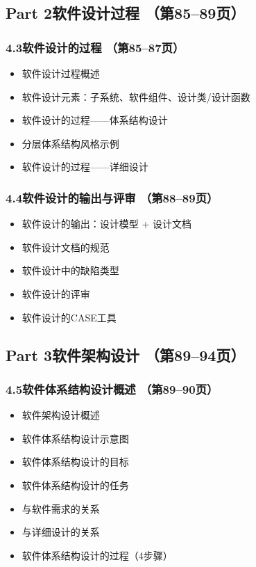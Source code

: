 \documentclass[12pt,a4paper]{ctexart}
\begin{document}
\subsection{Part 2\quad 软件设计过程 \hfill（第85--89页）}

\subsubsection{4.3\quad 软件设计的过程 \hfill（第85--87页）}
\begin{itemize}
    \item 软件设计过程概述
    \item 软件设计元素：子系统、软件组件、设计类/设计函数
    \item 软件设计的过程——体系结构设计
    \item 分层体系结构风格示例
    \item 软件设计的过程——详细设计
\end{itemize}

\subsubsection{4.4\quad 软件设计的输出与评审 \hfill（第88--89页）}
\begin{itemize}
    \item 软件设计的输出：设计模型 + 设计文档
    \item 软件设计文档的规范
    \item 软件设计中的缺陷类型
    \item 软件设计的评审
    \item 软件设计的CASE工具
\end{itemize}

\subsection{Part 3\quad 软件架构设计 \hfill（第89--94页）}

\subsubsection{4.5\quad 软件体系结构设计概述 \hfill（第89--90页）}
\begin{itemize}
    \item 软件架构设计概述
    \item 软件体系结构设计示意图
    \item 软件体系结构设计的目标
    \item 软件体系结构设计的任务
    \item 与软件需求的关系
    \item 与详细设计的关系
    \item 软件体系结构设计的过程（4步骤）
\end{itemize}
\end{document}
